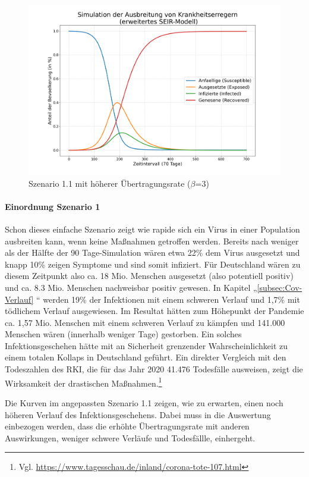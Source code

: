 \documentclass[12pt]{article}
\begin{document}
\begin{figure}[H]
\centering
\includegraphics[scale=0.35]{Szenario_1_beta30}
\caption{Szenario 1.1 mit höherer Übertragungsrate ($\beta$=3)}
\label{fig:Szenario_1_beta30}
\end{figure}


\paragraph{Einordnung Szenario 1}
Schon dieses einfache Szenario zeigt wie rapide sich ein Virus in einer Population ausbreiten kann, wenn keine Maßnahmen getroffen werden. Bereits nach weniger als der Hälfte der 90 Tage-Simulation wären etwa 22\% dem Virus ausgesetzt und knapp 10\% zeigen Symptome und sind somit infiziert. Für Deutschland wären zu diesem Zeitpunkt also ca. 18 Mio. Menschen ausgesetzt (also potentiell positiv) und ca. 8.3 Mio. Menschen nachweisbar positiv gewesen. In Kapitel „\ref{subsec:Cov-Verlauf} “ werden 19\% der Infektionen mit einem schweren Verlauf und 1,7\% mit tödlichem Verlauf ausgewiesen. Im Resultat hätten zum Höhepunkt der Pandemie ca. 1,57 Mio. Menschen mit einem schweren Verlauf zu kämpfen und 141.000 Menschen wären (innerhalb weniger Tage) gestorben. Ein solches Infektionsgeschehen hätte mit an Sicherheit grenzender Wahrscheinlichkeit zu einem totalen Kollaps in Deutschland geführt. Ein direkter Vergleich mit den Todeszahlen des RKI, die für das Jahr 2020 41.476 Todesfälle ausweisen, zeigt die Wirksamkeit der drastischen Maßnahmen.\footnote{Vgl. \url{https://www.tagesschau.de/inland/corona-tote-107.html}}

Die Kurven im angepassten Szenario 1.1 zeigen, wie zu erwarten, einen noch höheren Verlauf des Infektionsgeschehens. Dabei muss in die Auswertung einbezogen werden, dass die erhöhte Übertragungsrate mit anderen Auswirkungen, weniger schwere Verläufe und Todesfällle, einhergeht.
\end{document}

